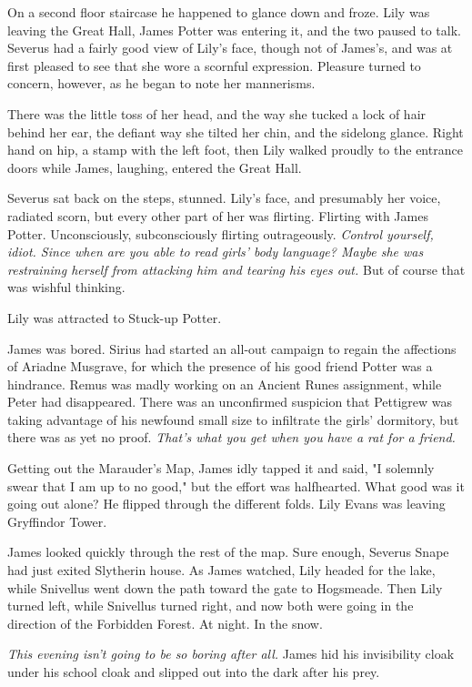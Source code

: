 On a second floor staircase he happened to glance down and froze. Lily was leaving the Great Hall, James Potter was entering it, and the two paused to talk. Severus had a fairly good view of Lily's face, though not of James's, and was at first pleased to see that she wore a scornful expression. Pleasure turned to concern, however, as he began to note her mannerisms.

There was the little toss of her head, and the way she tucked a lock of hair behind her ear, the defiant way she tilted her chin, and the sidelong glance. Right hand on hip, a stamp with the left foot, then Lily walked proudly to the entrance doors while James, laughing, entered the Great Hall.

Severus sat back on the steps, stunned. Lily's face, and presumably her voice, radiated scorn, but every other part of her was flirting. Flirting with James Potter. Unconsciously, subconsciously flirting outrageously. \emph{Control yourself, idiot. Since when are you able to read girls' body language? Maybe she was restraining herself from attacking him and tearing his eyes out.} But of course that was wishful thinking.

Lily was attracted to Stuck-up Potter.

James was bored. Sirius had started an all-out campaign to regain the affections of Ariadne Musgrave, for which the presence of his good friend Potter was a hindrance. Remus was madly working on an Ancient Runes assignment, while Peter had disappeared. There was an unconfirmed suspicion that Pettigrew was taking advantage of his newfound small size to infiltrate the girls' dormitory, but there was as yet no proof. \emph{That's what you get when you have a rat for a friend.}

Getting out the Marauder's Map, James idly tapped it and said, "I solemnly swear that I am up to no good," but the effort was halfhearted. What good was it going out alone? He flipped through the different folds. Lily Evans was leaving Gryffindor Tower.

James looked quickly through the rest of the map. Sure enough, Severus Snape had just exited Slytherin house. As James watched, Lily headed for the lake, while Snivellus went down the path toward the gate to Hogsmeade. Then Lily turned left, while Snivellus turned right, and now both were going in the direction of the Forbidden Forest. At night. In the snow.

\emph{This evening isn't going to be so boring after all.} James hid his invisibility cloak under his school cloak and slipped out into the dark after his prey.

